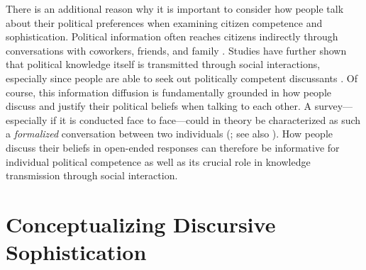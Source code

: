 There is an additional reason why it is important to consider how people talk about their political preferences when examining citizen competence and sophistication. Political information often reaches citizens indirectly through conversations with coworkers, friends, and family \citep[see][for a recent example]{druckman2018no}. Studies have further shown that political knowledge itself is transmitted through social interactions, especially since people are able to seek out politically competent discussants \citep{huckfeldt2001social,eveland2009political}. Of course, this information diffusion is fundamentally grounded in how people discuss and justify their political beliefs when talking to each other. A survey---especially if it is conducted face to face---could in theory be characterized as such a \textit{formalized} conversation between two individuals (\citealt{sudman1996thinking}; see also \citealt{grice1975logic,grice1978further}). How people discuss their beliefs in open-ended responses can therefore be informative for individual political competence as well as its crucial role in knowledge transmission through social interaction. 


\section*{Conceptualizing Discursive Sophistication}



